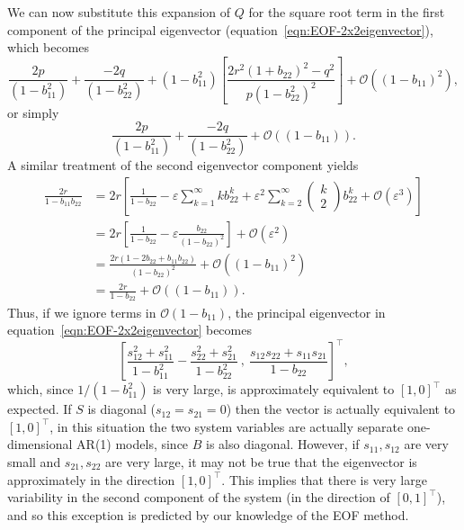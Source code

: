 We can now substitute this expansion of $Q$ for the square root term in the first component of the principal eigenvector (equation~\ref{eqn:EOF-2x2eigenvector}), which becomes
	\begin{equation}
		\frac{2p}{(1-b_{11}^2)} + 
		\frac{-2q}{(1-b_{22}^2)}+
		(1-b_{11}^2) \left[ \frac{2r^2(1+ b_{22})^2 -  q^2 }{p(1-b_{22}^2)^2}\right]
		+ \mathcal{O}((1-b_{11})^2),
	\end{equation}
or simply
	\begin{equation}
		\frac{2p}{(1-b_{11}^2)} + 
		\frac{-2q}{(1-b_{22}^2)}
		+ \mathcal{O}((1-b_{11})).
	\end{equation}
A similar treatment of the second eigenvector component yields
	\begin{align}
		\frac{2r}{1-b_{11}b_{22}} & = 2r\left[\frac{1}{1-b_{22}} -
		\varepsilon\sum_{k=1}^\infty kb_{22}^k + \varepsilon^2\sum_{k=2}^\infty\left(\begin{array}{c}k\\2\end{array}\right)b_{22}^k + \mathcal{O}(\varepsilon^3)
		\right]\\
		& = 2r\left[\frac{1}{1-b_{22}} -
		\varepsilon\frac{b_{22}}{(1-b_{22})^2}
		\right]
		+ \mathcal{O}(\varepsilon^2)\\
		& = \frac{2r(1 - 2b_{22} + b_{11}b_{22})}{(1-b_{22})^2}
		+ \mathcal{O}((1-b_{11})^2)\\
		& = \frac{2r}{1-b_{22}}+ \mathcal{O}((1-b_{11})).
	\end{align}
Thus, if we ignore terms in $\mathcal{O}(1-b_{11})$, the principal eigenvector in equation~\ref{eqn:EOF-2x2eigenvector} becomes
\begin{equation}
\left[\frac{s_{12}^2+s_{11}^2}{1-b_{11}^2}-\frac{s_{22}^2+s_{21}^2}{1-b_{22}^2} ~,~\frac{s_{12}s_{22}+s_{11}s_{21}}{1-b_{22}}
\right]^\top,
\label{eqn:2D:EOFeigenVector}
\end{equation}
which, since $1/(1-b_{11}^2)$ is very large, is approximately equivalent to $[1,0]^\top$ as expected. If $S$ is diagonal ($s_{12}=s_{21}=0$) then the vector is actually equivalent to $[1,0]^\top$, in this situation the two system variables are actually separate one-dimensional AR(1) models, since $B$ is also diagonal. However, if $s_{11},s_{12}$ are very small and $s_{21},s_{22}$ are very large, it may not be true that the eigenvector is approximately in the direction $[1,0]^\top$. This implies that there is very large variability in the second component of the system (in the direction of $[0,1]^\top$), and so this exception is predicted by our knowledge of the EOF method. 

